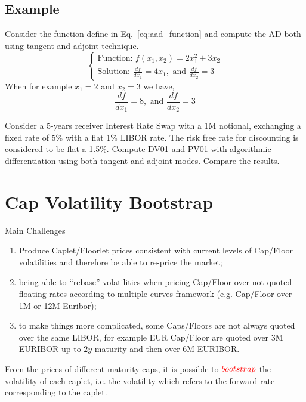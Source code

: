 \documentclass[12pt,a4paper]{article}
\begin{document}
\subsection{Example}
Consider the function define in Eq.~\ref{eq:aad_function} and compute the AD both using tangent and adjoint technique.
\begin{equation}
\begin{cases}
\text{Function: } f(x_1, x_2) = 2x_1^2 + 3x_2\\
\text{Solution: } \frac{df}{dx_1} = 4x_1, \text{ and } \frac{df}{dx_2}=3
\end{cases}
\end{equation}
When for example $x_1=2$ and $x_2 = 3$ we have,
\begin{equation}
\frac{df}{dx_1} = 8, \text{ and } \frac{df}{dx_2}=3
\end{equation}

\begin{question}
Consider a 5-years receiver Interest Rate Swap with a 1M notional, exchanging a fixed rate of 5\% with a flat 1\% LIBOR rate. The risk free rate for discounting is considered to be flat a 1.5\%.
Compute DV01 and PV01 with algorithmic differentiation using both tangent and adjoint modes. Compare the results.
\end{question}

\clearpage
\section{Cap Volatility Bootstrap}

Main Challenges
	\begin{enumerate}
		\item Produce Caplet/Floorlet prices consistent with current levels of Cap/Floor volatilities and therefore be able to re-price the market;
		\item being able to “rebase” volatilities when pricing Cap/Floor over not quoted floating rates according to multiple curves framework (e.g. Cap/Floor over 1M or 12M Euribor);
		\item to make things more complicated, some Caps/Floors are not always quoted over the same LIBOR, for example EUR Cap/Floor are quoted over 3M EURIBOR up to $2y$ maturity and then over 6M EURIBOR.
	\end{enumerate}

From the prices of different maturity caps, it is possible to $\color{red}{bootstrap}$ the volatility of each caplet, i.e. the volatility which refers to the forward rate corresponding to the caplet.
\end{document}
